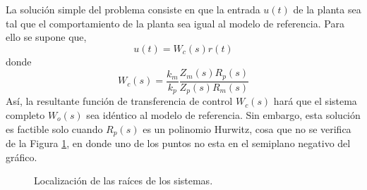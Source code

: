 \documentclass[letterpaper,11pt]{article} %
\begin{document}
La solución simple del problema consiste en que la entrada $u(t)$ de la planta sea tal que el comportamiento de la planta sea igual al modelo de referencia. Para ello se supone que,
\begin{equation}
	u(t) = W_c(s)r(t)
\end{equation}
donde
\begin{equation}
	W_c(s) = \frac{k_m}{k_p} \frac{Z_m(s) R_p(s)}{Z_p(s) R_m(s)}
	\label{lema}
\end{equation}
Así, la resultante función de transferencia de control $W_c(s)$ hará que el sistema completo $W_o(s)$ sea idéntico al modelo de referencia. Sin embargo, esta solución es factible solo cuando $R_p(s)$ es un polinomio Hurwitz, cosa que no se verifica de la Figura \ref{locus}, en donde uno de los puntos no esta en el semiplano negativo del gráfico.\\
\begin{figure}[h]
	\centering
	\caption{Localización de las raíces de los sistemas.}
	\label{locus}
\end{figure}
\end{document}

